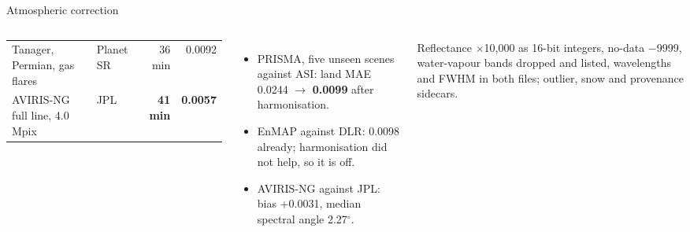 \documentclass[aspectratio=169,10pt]{beamer}
\begin{document}
\begin{frame}{Atmospheric correction}
\begin{columns}[T,onlytextwidth]
{\begin{tabular}{@{}llrr@{}}
Tanager, Permian, gas flares & Planet SR & 36 min & 0.0092\\
\rowcolor{ochre!14}AVIRIS-NG full line, 4.0 Mpix & JPL & \textbf{41 min} & \textbf{0.0057}\\
\bottomrule
\end{tabular}}\par
\par
\begin{itemize}\setlength{\itemsep}{0.3mm}\scriptsize
\item PRISMA, five unseen scenes against ASI: land MAE 0.0244 $\to$ \textbf{0.0099} after harmonisation.
\item EnMAP against DLR: 0.0098 already; harmonisation did not help, so it is off.
\item AVIRIS-NG against JPL: bias +0.0031, median spectral angle 2.27$^\circ$.
\end{itemize}
\vspace{1mm}
\par
{\scriptsize Reflectance $\times$10,000 as 16-bit integers, no-data $-$9999, water-vapour bands dropped and listed, wavelengths and FWHM in both files; outlier, snow and provenance sidecars.\par}
\end{columns}
\end{frame}
\end{document}
